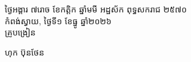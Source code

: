 \documentclass[a4paper,10pt]{article}
\begin{document}
\vspace{6pt}
\hfill
\begin{minipage}{10.5cm}
  {\centering
    ថ្ងៃអង្គារ ៧រោច ខែកត្តិក ឆ្នាំមមី អដ្ឋស័ក ពុទ្ធសករាជ ២៥៧០\\[2pt]
    កំពង់ស្វាយ, ថ្ងៃទី១ ខែធ្នូ ឆ្នាំ២០២៦\\[3pt]
    {\muol គ្រូបង្រៀន}\par}
  \vspace{28pt}
  \hfill{\muol ហុក ប៊ុនថែន}\hspace*{1.4cm}
\end{minipage}
\end{document}
